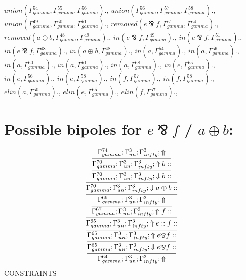 \documentclass[a4paper, 11pt]{article}
\begin{document}
$union(\Gamma_{gamma}^{54}, \Gamma_{gamma}^{55}, \Gamma_{gamma}^{56}).$, $union(\Gamma_{gamma}^{56}, \Gamma_{gamma}^{57}, \Gamma_{gamma}^{58}).$, $union(\Gamma_{gamma}^{49}, \Gamma_{gamma}^{50}, \Gamma_{gamma}^{51}).$, $removed(e \bindnasrepma f, \Gamma_{gamma}^{51}, \Gamma_{gamma}^{54}).$, $removed(a \oplus b, \Gamma_{gamma}^{48}, \Gamma_{gamma}^{49}).$, $in(e \bindnasrepma f, \Gamma_{gamma}^{49}).$, $in(e \bindnasrepma f, \Gamma_{gamma}^{51}).$, $in(e \bindnasrepma f, \Gamma_{gamma}^{48}).$, $in(a \oplus b, \Gamma_{gamma}^{48}).$, $in(a, \Gamma_{gamma}^{54}).$, $in(a, \Gamma_{gamma}^{56}).$, $in(a, \Gamma_{gamma}^{50}).$, $in(a, \Gamma_{gamma}^{51}).$, $in(a, \Gamma_{gamma}^{58}).$, $in(e, \Gamma_{gamma}^{55}).$, $in(e, \Gamma_{gamma}^{56}).$, $in(e, \Gamma_{gamma}^{58}).$, $in(f, \Gamma_{gamma}^{57}).$, $in(f, \Gamma_{gamma}^{58}).$, $elin(a, \Gamma_{gamma}^{50}).$, $elin(e, \Gamma_{gamma}^{55}).$, $elin(f, \Gamma_{gamma}^{57}).$, 
\section{Possible bipoles for $e \bindnasrepma f$ / $a \oplus b$:} 

{\small
\[
\infer{\Gamma_{ gamma}^{64} ; \Gamma_{un}^{3} ; \Gamma_{ infty}^{3} ;  \Uparrow }
{\infer{\Gamma_{ gamma}^{65} ; \Gamma_{un}^{3} ; \Gamma_{ infty}^{3} ;  \Downarrow e \bindnasrepma f :: }
{\infer{\Gamma_{ gamma}^{65} ; \Gamma_{un}^{3} ; \Gamma_{ infty}^{3} ;  \Uparrow e \bindnasrepma f :: }
{\infer{\Gamma_{ gamma}^{65} ; \Gamma_{un}^{3} ; \Gamma_{ infty}^{3} ;  \Uparrow e :: f :: }
{\infer{\Gamma_{ gamma}^{67} ; \Gamma_{un}^{3} ; \Gamma_{ infty}^{3} ;  \Uparrow f :: }
{\infer{\Gamma_{ gamma}^{69} ; \Gamma_{un}^{3} ; \Gamma_{ infty}^{3} ;  \Uparrow }
{\infer{\Gamma_{ gamma}^{70} ; \Gamma_{un}^{3} ; \Gamma_{ infty}^{3} ;  \Downarrow a \oplus b :: }
{\infer{\Gamma_{ gamma}^{70} ; \Gamma_{un}^{3} ; \Gamma_{ infty}^{3} ;  \Downarrow b :: }
{\infer{\Gamma_{ gamma}^{70} ; \Gamma_{un}^{3} ; \Gamma_{ infty}^{3} ;  \Uparrow b :: }
{\Gamma_{ gamma}^{74} ; \Gamma_{un}^{3} ; \Gamma_{ infty}^{3} ;  \Uparrow }}}}}}}}}
\]
}
CONSTRAINTS
\end{document}
